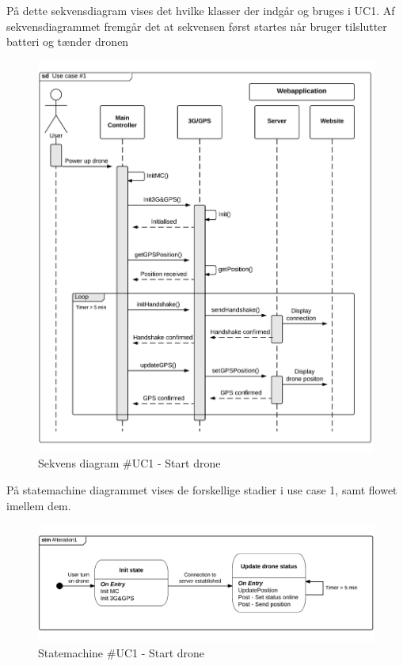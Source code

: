 \newpage

På dette sekvensdiagram vises det hvilke klasser der indgår og bruges i UC1. Af sekvensdiagrammet fremgår det at sekvensen først startes når bruger tilslutter batteri og tænder dronen 

\vspace{-5pt}
\begin{figure}[H]
	\centering
	\includegraphics[width=1\textwidth]{Billeder/sekvens/sekvens_UC1.png}
	\vspace{-1cm}
	\caption{Sekvens diagram \#UC1 - Start drone}
	\label{fig:Sekvens diagram_UC1}
\end{figure}

\newpage

På statemachine diagrammet vises de forskellige stadier i use case 1, samt flowet imellem dem.
\vspace{-5pt}
\begin{figure}[H]
	\centering
	\includegraphics[width=1\textwidth]{Billeder/statemachine/state_UC1.png}
	\vspace{-1cm}
	\caption{Statemachine \#UC1 - Start drone}
	\label{fig:Statemachine_UC1}
\end{figure}

